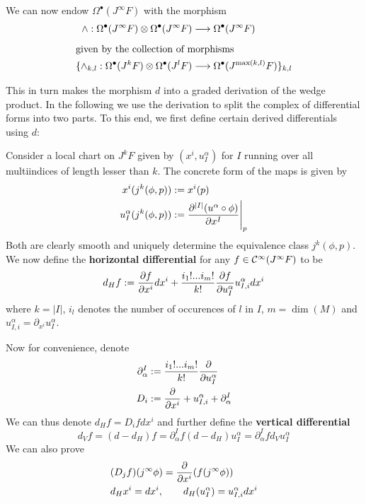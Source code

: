 We can now endow $\Omega^\bullet(J^\infty F)$ with the morphism
\begin{align}
  \wedge: \Omega^\bullet(J^\infty F) \mathbin{\mathop{\otimes}\displaylimits_{}} \Omega^\bullet(J^\infty F) &\longrightarrow \Omega^\bullet(J^\infty F)\\
  \intertext{given by the collection of morphisms}
  \{ \wedge_{k,l}: \Omega^\bullet(J^k F) \mathbin{\mathop{\otimes}\displaylimits_{}} \Omega^\bullet(J^l F) &\longrightarrow \Omega^\bullet(J^{\max(k,l)} F) \}_{k,l}
\end{align}
This in turn makes the morphism $d$ into a graded derivation of the wedge product. In the following we use the derivation to split the complex of differential forms into two parts. To this end, we first define certain derived differentials using $d$:

\begin{definition}
  Consider a local chart on $J^kF$ given by $(x^i, u^\alpha_I)$ for $I$ running over all multiindices of length lesser than $k$. The concrete form of the maps is given by
  \begin{align}
    x^i(j^k(\phi, p)) &:= x^i(p)\\
    u^\alpha_I (j^k(\phi, p)) &:= \dell{^{|I|} (u^\alpha \circ \phi)}{x^I} \Bigg|_p
  \end{align}
  Both are clearly smooth and uniquely determine the equivalence class $j^k(\phi, p)$. We now define the \textbf{horizontal differential} for any $f\in\mathcal{C}^{\infty}(J^\infty F)$ to be
  $$ d_H f := \frac{\partial f}{\partial x^i} dx^i + \frac{i_1 ! ... i_m !}{k!} \frac{\partial f}{\partial u^\alpha_I} u^\alpha_{I,i} dx^i$$
  where $k = |I|$, $i_l$ denotes the number of occurences of $l$ in $I$, $m = \dim(M)$ and $u^\alpha_{I,i} = \partial_{x^i} u^\alpha_I$.
\end{definition}

Now for convenience, denote
\begin{align}
  \partial^I_\alpha &:= \frac{i_1 ! ... i_m !}{k!} \frac{\partial }{\partial u^\alpha_I}\\
  D_i &:= \frac{\partial }{\partial x^i} + u^\alpha_{I,i} + \partial^I_\alpha
\end{align}
We can thus denote $d_H f = D_i f dx^i$ and further define the \textbf{vertical differential}
$$ d_V f = (d-d_H) f = \partial^I_\alpha f (d-d_H) u^\alpha_I = \partial^I_\alpha f d_V u^\alpha_I$$
We can also prove
\begin{align}
  &(D_j f ) (j^\infty \phi) = \dell{}{x^i}(f(j^\infty \phi))\\
  &d_H x^i = dx^i, \quad \quad d_H(u^\alpha_I) = u^\alpha_{I,i} dx^i
\end{align}

